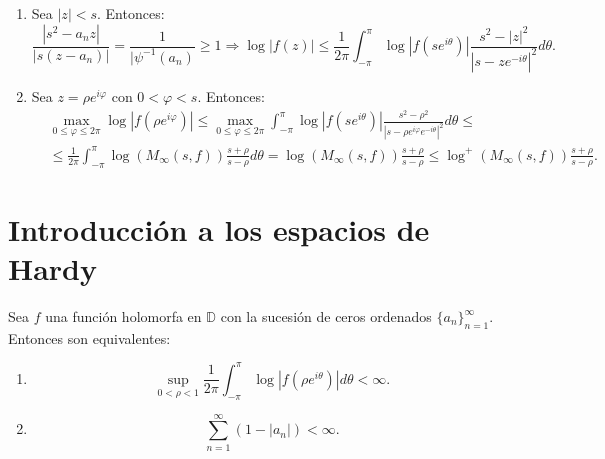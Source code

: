 \begin{remark}
    \hfill
    \begin{enumerate}
        \item Sea $|z| < s$.
              Entonces:
              $$\frac{|s^2-a_nz|}{|s(z-a_n)|} = \frac{1}{|\psi^{-1}(a_n)} \geq 1 \Rightarrow \log|f(z)| \leq \frac{1}{2\pi} \int_{-\pi}^\pi \log|f(se^{i\theta})|\frac{s^2-|z|^2}{|s-ze^{-i\theta}|^2}d\theta.$$
        \item Sea $z = \rho e^{i\varphi}$ con $0 < \varphi < s$.
              Entonces:
              \begin{align*}
                   & \max_{0 \leq \varphi \leq 2\pi} \log|f(\rho e^{i\varphi})| \leq \max_{0 \leq \varphi \leq 2\pi} \int_{-\pi}^\pi \log|f(se^{i\theta})|\frac{s^2-\rho^2}{|s-\rho e^{i\varphi}e^{-i\theta}|^2}d\theta \leq \\
                   & \leq \frac{1}{2\pi} \int_{-\pi}^\pi \log(M_\infty(s, f))\frac{s+\rho}{s-\rho}d\theta = \log(M_\infty(s, f))\frac{s+\rho}{s-\rho} \leq \log^+(M_\infty(s, f))\frac{s+\rho}{s-\rho}.
              \end{align*}
    \end{enumerate}
\end{remark}

\section{Introducción a los espacios de Hardy}
\begin{theorem}
    Sea $f$ una función holomorfa en $\mathbb{D}$ con la sucesión de ceros ordenados $\{a_n\}_{n=1}^\infty$.
    Entonces son equivalentes:
    \begin{enumerate}
        \item $$\sup_{0<\rho<1} \frac{1}{2\pi} \int_{-\pi}^\pi \log|f(\rho e^{i\theta})|d\theta < \infty.$$
        \item $$\sum_{n=1}^\infty (1-|a_n|) < \infty.$$
    \end{enumerate}
\end{theorem}

